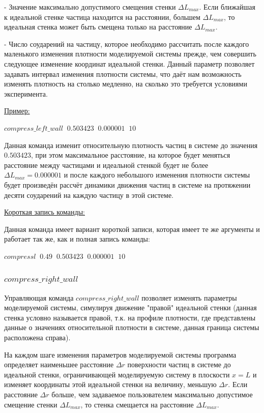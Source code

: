\documentclass[a4paper]{article}
\begin{document}
- Значение максимально допустимого смещения стенки $ \Delta L_{max} $. Если ближайшая к идеальной стенке частица находится на расстоянии, большем $ \Delta L_{max} $, то идеальная стенка может быть смещена только на расстояние $ \Delta L_{max} $.

- Число соударений на частицу, которое необходимо рассчитать после каждого маленького изменения плотности моделируемой системы прежде, чем совершить следующее изменение координат идеальной стенки. Данный параметр позволяет задавать интервал изменения плотности системы, что даёт нам возможность изменять плотность на столько медленно, на сколько  это требуется условиями эксперимента.

\uline{Пример:}

$ compress\_left\_wall \;\; 0.503423 \;\; 0.000001 \;\; 10 $

Данная команда изменит относительную плотность частиц в системе до значения $ 0.503423 $, при этом максимальное расстояние, на которое будет меняться расстояние между частицами и идеальной стенкой будет не более $ \Delta L_{max} = 0.000001 $ и после каждого небольшого изменения плотности системы будет произведён рассчёт динамики движения частиц в системе на протяжении десяти соударений на каждую частицу в этой системе.

\uline{Короткая запись команды:}

Данная команда имеет вариант короткой записи, которая имеет те же аргументы и работает так же, как и полная запись команды:

$ compressl \;\; 0.49 \;\; 0.503423 \;\; 0.000001 \;\; 10 $

\subsubsection{$ compress\_right\_wall $}
Управляющая команда $ compress\_right\_wall $ позволяет изменять параметры моделируемой системы, симулируя движение "правой" идеальной стенки (данная стенка условно называется правой, т.к. на профиле плотности, где представлены данные о значениях относительной плотности в системе, данная граница системы расположена справа).

На каждом шаге изменения параметров моделируемой системы программа определяет наименьшее расстояние $ \Delta r $ поверхности частиц в системе до идеальной стенки, ограничивающей моделируемую систему в плоскости $ x = L $ и изменяет координаты этой идеальной стенки на величину, меньшую $ \Delta r $. Если расстояние $ \Delta r $ больше, чем задаваемое пользователем максимально допустимое смещение стенки $ \Delta L_{max} $, то стенка смещается на расстояние $ \Delta L_{max} $.
\end{document}
